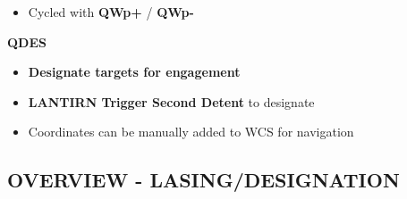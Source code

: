 \documentclass[fontSpartan]{TechCheck}
\begin{document}
\begin{tableitemize}
{\begin{subitemize}
\begin{itemize}
				\item Cycled with \textbf{QWp+} / \textbf{QWp-}
			\end{itemize}
			\item \textbf{QDES}
			\begin{itemize}
				\item \textbf{Designate targets for engagement}
				\item \textbf{LANTIRN Trigger Second Detent} to designate
				\item Coordinates can be manually added to WCS for navigation
			\end{itemize}
		\end{subitemize}}
	\end{tableitemize}

	\clearpage

	\subsection{OVERVIEW - LASING/DESIGNATION}
	\label{subsec:lantirnlasingdesignation}
\end{document}
